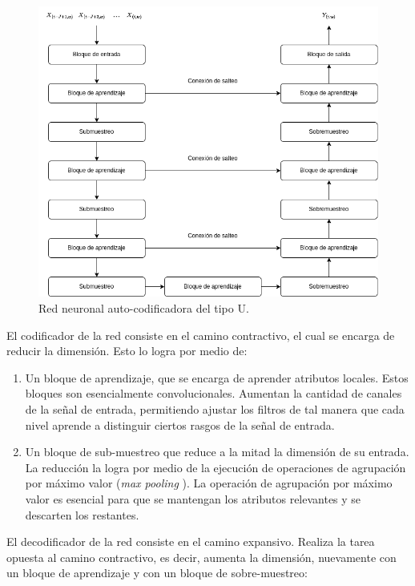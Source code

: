 \begin{figure}
	\centering
	\centerline{\includegraphics[scale=0.65]{images/ch3/unet.png}}
	\caption{Red neuronal auto-codificadora del tipo U.}
	\label{fig:ch3_unet}
\end{figure}

El codificador de la red consiste en el camino contractivo, el cual se encarga de reducir la dimensión. Esto lo logra por medio de:

\begin{enumerate}
	\item Un bloque de aprendizaje, que se encarga de aprender atributos locales. Estos bloques son esencialmente convolucionales. Aumentan la cantidad de canales de la señal de entrada, permitiendo ajustar los filtros de tal manera que cada nivel aprende a distinguir ciertos rasgos de la señal de entrada.
	
	\item Un bloque de sub-muestreo que reduce a la mitad la dimensión de su entrada. La reducción la logra por medio de la ejecución de operaciones de agrupación por máximo valor (\emph{max pooling} \cite{deep_learning}). La operación de agrupación por máximo valor es esencial para que se mantengan los atributos relevantes y se descarten los restantes.
\end{enumerate}

El decodificador de la red consiste en el camino expansivo. Realiza la tarea opuesta al camino contractivo, es decir, aumenta la dimensión, nuevamente con un bloque de aprendizaje y con un bloque de sobre-muestreo:


